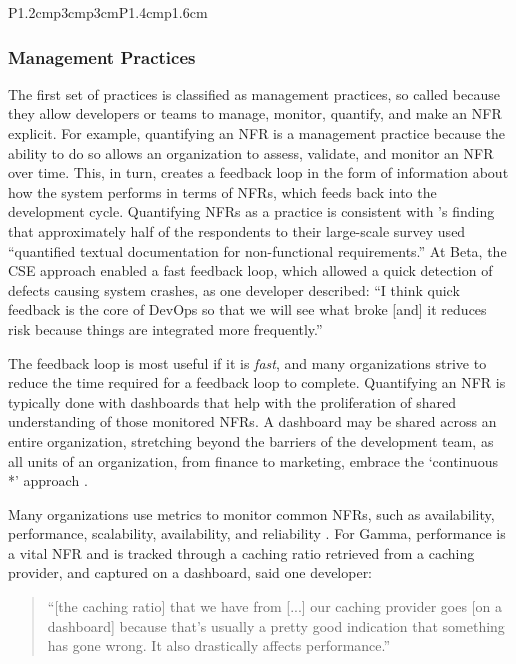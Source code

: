 \documentclass[smallextended]{svjour3}       %
\begin{document}
\begin{longtable}{P{1.2cm}p{3cm}p{3cm}P{1.4cm}p{1.6cm}}



\end{longtable}
\endgroup 



\subsubsection{Management Practices}
\label{sub:management}
The first set of practices is classified as management practices, so called because they allow developers or teams to manage, monitor, quantify, and make an NFR explicit. For example, quantifying an NFR is a management practice because the ability to do so allows an organization to assess, validate, and monitor an NFR over time. This, in turn, creates a feedback loop in the form of information about how the system performs in terms of NFRs, which feeds back into the development cycle. Quantifying NFRs as a practice is consistent with \citet{wagner2019status}'s finding that approximately half of the respondents to their large-scale survey used ``quantified textual documentation for non-functional requirements.''
At Beta, the CSE approach enabled a fast feedback loop, which allowed a quick detection of defects causing system crashes, as one developer described: 
\textmd{``I think quick feedback is the core of DevOps so that we will see what broke [and] it reduces risk because things are integrated more frequently.''}


The feedback loop is most useful if it is \emph{fast},  and many organizations strive to reduce the time required for a feedback loop to complete. 
Quantifying an NFR is typically done with dashboards that help with the proliferation of shared understanding of those monitored NFRs.
A dashboard may be shared across an entire organization, stretching beyond the barriers of the development team, as all units of an organization, from finance to marketing, embrace the `continuous *' approach \citep{fitzgerald2017continuous}.

Many organizations use metrics to monitor common NFRs, such as availability, performance, scalability, availability, and reliability \citep{werner_tse_2021}.
For Gamma, performance is a vital NFR and is tracked through a caching ratio retrieved from a caching provider, and captured on a dashboard, said one developer:
\begin{quote}
``[the caching ratio] that we have from [...] our caching provider goes [on a dashboard] because that's usually a pretty good indication that something has gone wrong. It also drastically affects performance.''    
\end{quote}
\end{document}
